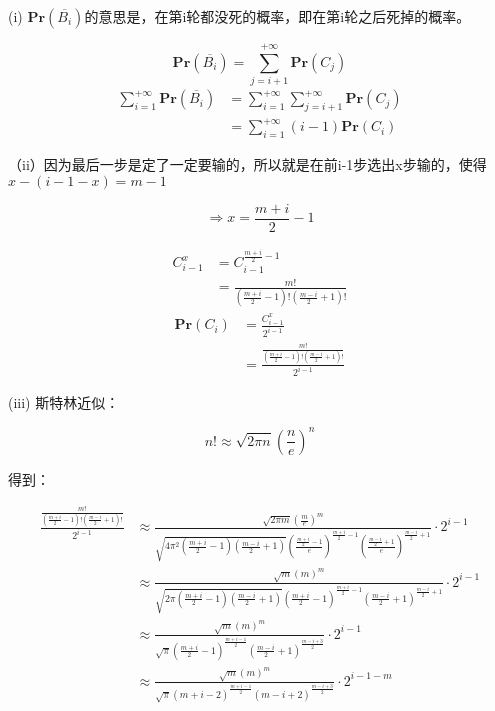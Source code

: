 \documentclass[12pt, a4paper, oneside]{ctexart}
\begin{document}
\begin{solution}
  (i) $\displaystyle{ \mathbf{Pr}(\overline{B_i}) }$的意思是，在第i轮都没死的概率，即在第i轮之后死掉的概率。

  $$\mathbf{Pr}(\overline{B_i}) = \sum_{j=i+1}^{+\infty}\mathbf{Pr}(C_j)$$
  $$\begin{aligned}
      \sum_{i=1}^{+\infty} \mathbf{Pr}(\overline{B_i}) & = \sum_{i=1}^{+\infty} \sum_{j=i+1}^{+\infty}\mathbf{Pr}(C_j) \\
                                                       & =\sum_{i=1}^{+\infty} (i-1) \mathbf{Pr}(C_i)
    \end{aligned}$$

  （ii）因为最后一步是定了一定要输的，所以就是在前i-1步选出x步输的，使得$x-(i-1-x)=m-1$

  $$\Rightarrow x=\frac{m+i}{2} -1$$

  $$
    \begin{aligned}
      C^x_{i-1} & = C^{\frac{m+i}{2} -1}_{i-1}                       \\
                & =\frac{m!}{(\frac{m+i}{2} -1)!(\frac{m-i}{2} +1)!}
    \end{aligned}
  $$
  $$
    \begin{aligned}
      \mathbf{Pr}(C_i) & = \frac{C^x_{i-1}}{2^{i-1}}                                         \\
                       & = \frac{\frac{m!}{(\frac{m+i}{2} -1)!(\frac{m-i}{2} +1)!}}{2^{i-1}}
    \end{aligned}
  $$

  (iii)
  斯特林近似：

  $$n! \approx \sqrt{2\pi n}\left(\frac{n}{e}\right)^n$$

  得到：

  $$
    \begin{aligned}
      \frac{\frac{m!}{(\frac{m+i}{2} -1)!(\frac{m-i}{2} +1)!}}{2^{i-1}}
       & \approx \frac{\sqrt{2\pi m}\left(\frac{m}{e}\right)^m}{\sqrt{4\pi^2 (\frac{m+i}{2} -1)(\frac{m-i}{2} +1)}\left(\frac{\frac{m+i}{2} -1}{e}\right)^{\frac{m+i}{2} -1}\left(\frac{\frac{m-i}{2} +1}{e}\right)^{\frac{m-i}{2} +1}} \cdot 2^{i-1} \\
       & \approx \frac{\sqrt{m}\left({m}\right)^m}{\sqrt{2\pi (\frac{m+i}{2} -1)(\frac{m-i}{2} +1)}\left({\frac{m+i}{2} -1}\right)^{\frac{m+i}{2} -1}\left({\frac{m-i}{2} +1}\right)^{\frac{m-i}{2} +1}} \cdot 2^{i-1}                                \\
       & \approx \frac{\sqrt{m}\left({m}\right)^m}{\sqrt{\pi}\left({\frac{m+i}{2} -1}\right)^{\frac{m+i-1}{2}}\left({\frac{m-i}{2} +1}\right)^{\frac{m-i+3}{2}}} \cdot 2^{i-1}                                                                        \\
       & \approx \frac{\sqrt{m}\left({m}\right)^m}{\sqrt{\pi}(m+i-2)^{\frac{m+i-1}{2}}(m-i+2)^{\frac{m-i+3}{2}}} \cdot 2^{i-1-m}
    \end{aligned}$$


\end{solution}
\end{document}
